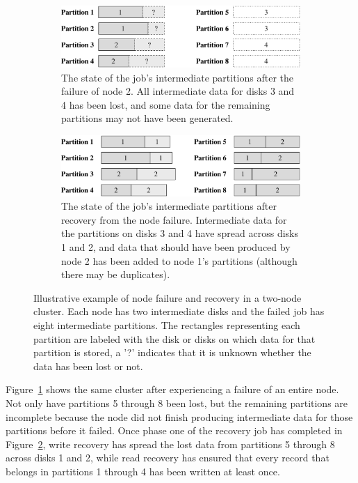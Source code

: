 \begin{figure}[t]
  \centering
  \begin{subfigure}[t]{\columnwidth}
    \centering
    \includegraphics[width=\textwidth]{fault_tolerance/figures/node_failure_before_recovery}
    \caption{\label{fig:node_fail_before} The state of the job's intermediate
      partitions after the failure of node 2. All intermediate data for disks 3
      and 4 has been lost, and some data for the remaining partitions may not
      have been generated.}
  \end{subfigure}\hspace{0.05\textwidth}
  \begin{subfigure}[t]{\columnwidth}
    \centering
    \includegraphics[width=\textwidth]{fault_tolerance/figures/node_failure_after_recovery}
    \caption{\label{fig:node_fail_after} The state of the job's intermediate
      partitions after recovery from the node failure. Intermediate data for
      the partitions on disks 3 and 4 have spread across disks 1 and 2, and
      data that should have been produced by node 2 has been added to node 1's
      partitions (although there may be duplicates).}
  \end{subfigure}
  \caption{\label{fig:node_fail} Illustrative example of node failure and
    recovery in a two-node cluster. Each node has two intermediate disks and
    the failed job has eight intermediate partitions. The rectangles
    representing each partition are labeled with the disk or disks on which
    data for that partition is stored, a '?' indicates that it is unknown
    whether the data has been lost or not.}
\end{figure}

Figure~\ref{fig:node_fail_before} shows the same cluster after experiencing a
failure of an entire node. Not only have partitions 5 through 8 been lost, but
the remaining partitions are incomplete because the node did not finish
producing intermediate data for those partitions before it failed. Once phase
one of the recovery job has completed in Figure~\ref{fig:node_fail_after},
write recovery has spread the lost data from partitions 5 through 8 across
disks 1 and 2, while read recovery has ensured that every record that belongs
in partitions 1 through 4 has been written at least once.

